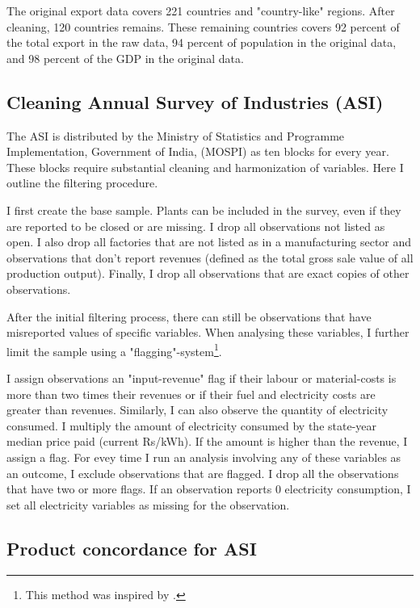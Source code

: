 \documentclass[11pt]{article}
\begin{document}
\begin{appendices}
The original export data covers 221 countries and "country-like" regions. After cleaning, 120 countries remains. These remaining countries covers 92 percent of the total export in the raw data, 94 percent of population in the original data, and 98 percent of the GDP in the original data. 

\subsection{Cleaning Annual Survey of Industries (ASI)}%
\label{sub:cleaning_annual_survey_of_industries_asi}

The ASI is distributed by the Ministry of Statistics and Programme Implementation, Government of India, (MOSPI) as ten blocks for every year. These blocks require substantial cleaning and harmonization of variables. Here I outline the filtering procedure.

I first create the base sample. Plants can be included in the survey, even if they are reported to be closed or are missing. I drop all observations not listed as open. I also drop all factories that are not listed as in a manufacturing sector and observations that don't report revenues (defined as the total gross sale value of all production output). Finally, I drop all observations that are exact copies of other observations.

After the initial filtering process, there can still be observations that have misreported values of specific variables. When analysing these variables, I further limit the sample using a "flagging"-system\footnote{This method was inspired by \cite{allcott_how_2016}.}. 

I assign observations an "input-revenue" flag if their labour or material-costs is more than two times their revenues or if their fuel and electricity costs are greater than revenues. Similarly, I can also observe the quantity of electricity consumed. I multiply the amount of electricity consumed by the state-year median price paid (current Rs/kWh). If the amount is higher than the revenue, I assign a flag. For evey time I run an analysis involving any of these variables as an outcome, I exclude observations that are flagged. I drop all the observations that have two or more flags. If an observation reports 0 electricity consumption, I set all electricity variables as missing for the observation.

\subsection{Product concordance for ASI}%
\label{sub:product_concordance_asi}


\end{appendices}
\end{document}
